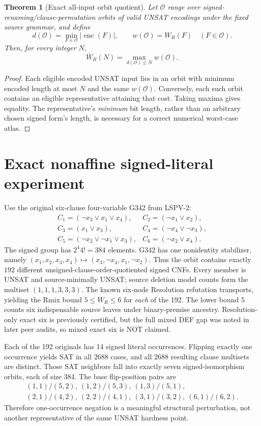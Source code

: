 \documentclass{article}
\newtheorem{theorem}{Theorem}
\begin{document}
\begin{theorem}[Exact all-input orbit quotient]
Let $\mathcal O$ range over signed-renaming/clause-permutation orbits of valid UNSAT encodings under the fixed source grammar, and define
\[
 d(\mathcal O)=\min_{F\in\mathcal O}|\operatorname{enc}(F)|,\qquad
 w(\mathcal O)=W_R(F)\quad(F\in\mathcal O).
\]
Then, for every integer $N$,
\[
 \boxed{\overline W_R(N)=\max_{d(\mathcal O)\le N}w(\mathcal O).}
\]
\end{theorem}
\begin{proof}
Each eligible encoded UNSAT input lies in an orbit with minimum encoded length at most $N$ and the same $w(\mathcal O)$. Conversely, each such orbit contains an eligible representative attaining that cost. Taking maxima gives equality. The representative's \emph{minimum} bit length, rather than an arbitrary chosen signed form's length, is necessary for a correct numerical worst-case atlas.
\end{proof}

\section*{Exact nonaffine signed-literal experiment}
Use the original six-clause four-variable G342 from LSPV-2:
\[
\begin{array}{ll}
C_1=(\neg x_3\vee x_1\vee x_4),& C_2=(\neg x_1\vee x_2),\\
C_3=(x_1\vee x_3),& C_4=(\neg x_4\vee\neg x_3),\\
C_5=(\neg x_2\vee\neg x_1\vee x_3),& C_6=(\neg x_2\vee x_4).
\end{array}
\]
The signed group has $2^4 4!=384$ elements. G342 has one nonidentity stabilizer, namely $(x_1,x_2,x_3,x_4)\mapsto(x_3,\neg x_4,x_1,\neg x_2)$. Thus the orbit contains exactly $192$ different unsigned-clause-order-quotiented signed CNFs. Every member is UNSAT and source-minimally UNSAT; source deletion model counts form the multiset $(1,1,1,3,3,3)$. The known six-node Resolution refutation transports, yielding the Rmix bound $5\le W_R\le6$ for \emph{each} of the 192. The lower bound $5$ counts six indispensable source leaves under binary-premise ancestry. Resolution-only exact six is previously certified, but the full mixed DEF gap was noted in later peer audits, so mixed exact six is NOT claimed.

Each of the 192 originals has 14 signed literal occurrences. Flipping exactly one occurrence yields SAT in all 2688 cases, and all 2688 resulting clause multisets are distinct. Those SAT neighbors fall into exactly seven signed-isomorphism orbits, each of size 384. The base flip-position pairs are
\[
\begin{gathered}
(1,1)/(5,2),\ (1,2)/(5,3),\ (1,3)/(5,1),\\
(2,1)/(4,2),\ (2,2)/(4,1),\ (3,1)/(3,2),\ (6,1)/(6,2).
\end{gathered}
\]
Therefore one-occurrence negation is a meaningful structural perturbation, not another representative of the same UNSAT hardness point.
\end{document}
